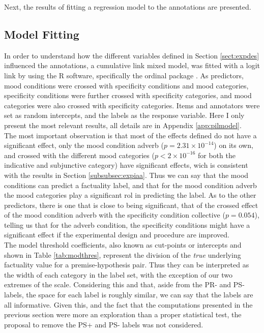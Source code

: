 Next, the results of fitting a regression model to the annotations are presented.

\subsection{Model Fitting}
In order to understand how the different variables defined in Section \ref{sect:expdes} influenced the annotations, a cumulative link mixed model, was fitted with a logit link by using the R software, specifically the ordinal package \citep{christensen2018cumulative}. As predictors, mood conditions were crossed with specificity conditions and mood categories, specificity conditions were further crossed with specificity categories, and mood categories were also crossed with specificity categories. Items and annotators were set as random intercepts, and the labels as the response variable. Here I only present the most relevant results, all details are in Appendix \ref{app:pilmodel}.\\

The most important observation is that most of the effects defined do not have a significant effect, only the mood condition adverb ($p=2.31\times10^{-14}$) on its own, and crossed with the different mood categories ($p< 2\times10^{-16}$ for both the indicative and subjunctive category) have significant effects, wich is consistent with the results in Section \ref{subsubsec:expiaa}. Thus we can say that the mood conditions can predict a factuality label, and that for the mood condition adverb the mood categories play a significant rol in predicting the label. As to the other predictors, there is one that is close to being significant, that of the crossed effect of the mood condition adverb with the specificity condition collective ($p = 0.054$), telling us that for the adverb condition, the specificity conditions might have a significant effect if the experimental design and procedure are improved.\\

The model threshold coefficients, also known as cut-points or intercepts \citep{christensen2018cumulative} and shown in Table \ref{tab:modthres}, represent the division of the \textit{true} underlying factuality value for a premise-hypothesis pair. Thus they can be interpreted as the width of each category in the label set, with the exception of our two extremes of the scale. Considering this and that, aside from the PR- and PS- labels, the space for each label is roughly similar, we can say that the labels are all informative. Given this, and the fact that the computations presented in the previous section were more an exploration than a proper statistical test, the proposal to remove the PS+ and PS- labels was not considered.\\ 

